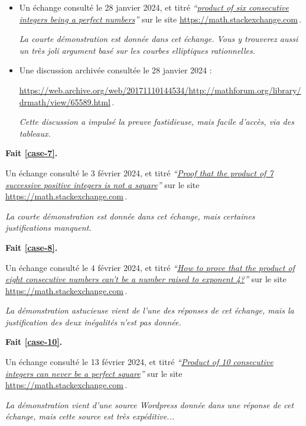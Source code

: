 \begin{itemize}
	\item Un échange consulté le 28 janvier 2024, et titré
\emph{\enquote{\href{https://math.stackexchange.com/q/90894/52365}{product of six consecutive integers being a perfect numbers}}} 
sur le site \url{https://math.stackexchange.com}\,.
	
	\smallskip
	\noindent
	\emph{La courte démonstration est donnée dans cet échange. Vous y trouverez aussi un très joli argument basé sur les courbes elliptiques rationnelles.}


	\item Une discussion archivée consultée le 28 janvier 2024 : 
	
	\noindent
	\url{https://web.archive.org/web/20171110144534/http://mathforum.org/library/drmath/view/65589.html}\,.
	
	\smallskip
	\noindent
	\emph{Cette discussion a impulsé la preuve fastidieuse, mais facile d'accès, via des tableaux.}
\end{itemize}
\vspace{-1ex}




\bigskip
\textbf{Fait \ref{case-7}.}
	
\smallskip
\noindent
Un échange consulté le 3 février 2024, et titré
\emph{\enquote{\href{https://math.stackexchange.com/q/2334887/52365}{Proof that the product of 7 successive positive integers is not a square}}} 
sur le site \url{https://math.stackexchange.com}\,.
	
\smallskip
\noindent
\emph{La courte démonstration est donnée dans cet échange, mais certaines justifications manquent.}




\bigskip
\textbf{Fait \ref{case-8}.}

\smallskip
\noindent
Un échange consulté le 4 février 2024, et titré \emph{\enquote{\href{https://math.stackexchange.com/a/2271715/52365}{How to prove that the product of eight consecutive numbers can't be a number raised to exponent 4?}}} sur le site \url{https://math.stackexchange.com}\,.

\smallskip
\noindent
\emph{La démonstration astucieuse vient de l'une des réponses de cet échange, mais la justification des deux inégalités n'est pas donnée.}




\bigskip
\textbf{Fait \ref{case-10}.}
	
\smallskip
\noindent
Un échange consulté le 13 février 2024, et titré
\emph{\enquote{\href{https://math.stackexchange.com/q/2361670/52365}{Product of 10 consecutive integers can never be a perfect square}}} 
sur le site \url{https://math.stackexchange.com}\,.

\smallskip
\noindent
\emph{La démonstration vient d'une source Wordpress donnée dans une réponse de cet échange, mais cette source est très expéditive...}

